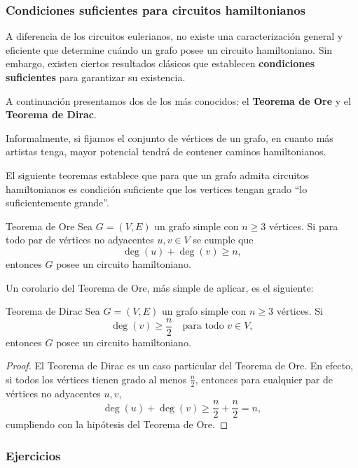\subsubsection{Condiciones suficientes para circuitos hamiltonianos}

A diferencia de los circuitos eulerianos, no existe una caracterización general y eficiente que determine cuándo un grafo posee un circuito hamiltoniano. Sin embargo, existen ciertos resultados clásicos que establecen \textbf{condiciones suficientes} para garantizar su existencia.

\medskip

A continuación presentamos dos de los más conocidos: el \textbf{Teorema de Ore} y el \textbf{Teorema de Dirac}.


 Informalmente, si fijamos el conjunto de vértices de un grafo, en cuanto más
 artistas tenga, mayor potencial tendrá de contener caminos hamiltonianos.
 
El siguiente  teoremas establece que para que un grafo admita circuitos
hamiltonianos es condición suficiente que los vertices tengan grado ``lo
suficientemente grande''.


\begin{thmblock}{Teorema de Ore}
Sea \( G = (V,E) \) un grafo simple con \( n \geq 3 \) vértices.  
Si para todo par de vértices no adyacentes \( u, v \in V \) se cumple que
\[
\deg(u) + \deg(v) \geq n,
\]
entonces \( G \) posee un circuito hamiltoniano.
\end{thmblock}

Un corolario del Teorema de Ore, más simple de aplicar, es el siguiente:
\begin{thmblock}{Teorema de Dirac}
Sea \( G = (V,E) \) un grafo simple con \( n \geq 3 \) vértices.  
Si
\[
\deg(v) \geq \frac{n}{2} \quad \text{para todo } v \in V,
\]
entonces \( G \) posee un circuito hamiltoniano.
\end{thmblock}

\begin{proof}
El Teorema de Dirac es un caso particular del Teorema de Ore.  
En efecto, si todos los vértices tienen grado al menos \( \frac{n}{2} \), entonces para cualquier par de vértices no adyacentes \( u, v \),
\[
\deg(u) + \deg(v) \geq \frac{n}{2} + \frac{n}{2} = n,
\]
cumpliendo con la hipótesis del Teorema de Ore.
\end{proof}

\subsubsection{Ejercicios}

